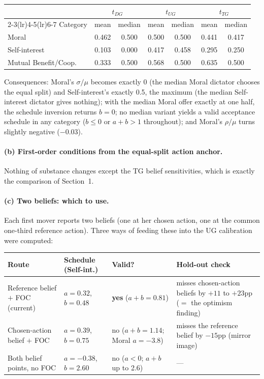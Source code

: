\documentclass[11pt]{article}
\begin{document}
\begin{center}
\small
\begin{tabular}{l cc cc cc}
\toprule
& \multicolumn{2}{c}{$t_{DG}$} & \multicolumn{2}{c}{$t_{UG}$} & \multicolumn{2}{c}{$t_{TG}$} \\
\cmidrule(lr){2-3}\cmidrule(lr){4-5}\cmidrule(lr){6-7}
Category & mean & median & mean & median & mean & median \\
\midrule
Moral & 0.462 & 0.500 & 0.500 & 0.500 & 0.441 & 0.417 \\
Self-interest & 0.103 & 0.000 & 0.417 & 0.458 & 0.295 & 0.250 \\
Mutual Benefit/Coop. & 0.333 & 0.500 & 0.568 & 0.500 & 0.635 & 0.500 \\
\bottomrule
\end{tabular}
\end{center}

Consequences: Moral's $\sigma/\mu$ becomes exactly 0 (the median Moral dictator chooses
the equal split) and Self-interest's exactly 0.5, the maximum (the median Self-interest
dictator gives nothing); with the median Moral offer exactly at one half, the schedule
inversion returns $b=0$; no median variant yields a valid acceptance schedule in any
category ($b\le0$ or $a+b>1$ throughout); and Moral's $\rho/\mu$ turns slightly negative
($-0.03$). 

\paragraph{(b) First-order conditions from the equal-split action anchor.} Nothing of substance changes except the
TG belief sensitivities, which is exactly the comparison of Section~1.

\paragraph{(c) Two beliefs: which to use.} Each first mover reports two beliefs (one at her chosen action, one at the common one-third reference
action). Three ways of feeding these into the UG calibration were computed:

\begin{center}
\footnotesize
\setlength{\tabcolsep}{4pt}
\begin{tabular}{l l l p{4.1cm}}
\toprule
Route & Schedule (Self-int.) & Valid? & Hold-out check \\
\midrule
Reference belief $+$ FOC (current) & $a=0.32$, $b=0.48$ & \textbf{yes} ($a{+}b=0.81$) &
misses chosen-action beliefs by $+11$ to $+23$pp ($=$ the optimism finding) \\
Chosen-action belief $+$ FOC & $a=0.39$, $b=0.75$ & no ($a{+}b=1.14$; Moral $a=-3.8$) &
misses the reference belief by $-15$pp (mirror image) \\
Both belief points, no FOC & $a=-0.38$, $b=2.60$ & no ($a<0$; $a{+}b$ up to 2.6) & --- \\
\bottomrule
\end{tabular}
\end{center}
\end{document}
